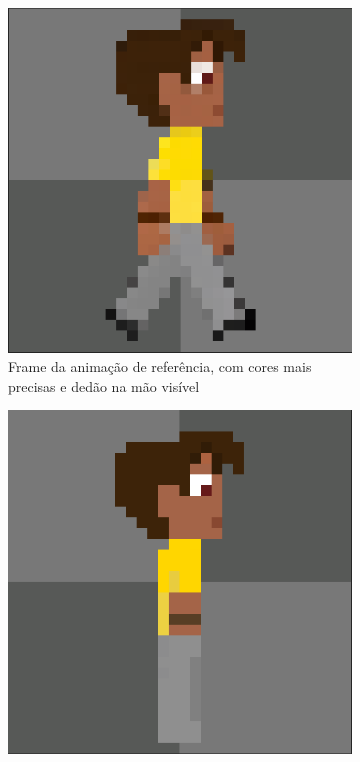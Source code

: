 \begin{figure}[htbp]
    \centering
    \caption{\small Comparação do sprite de referência com os frames da animação de base e da gerada no Pixel Lab}
    \label{fig:pixelLabAnimaComparaGemini}

    \begin{subfigure}{0.32\linewidth}
        \includegraphics[width=1\linewidth]{figs/pixelLab/dia4/print0.PNG}
        \caption{\small Frame da animação de referência, com cores mais precisas e dedão na mão visível}
        \label{fig:pixelLabAnimaComparaGeminiAni}
    \end{subfigure}
    \begin{subfigure}{0.32\linewidth}
        \includegraphics[width=1\linewidth]{figs/pixelLab/dia3/fix_oficial_fundo_igual.PNG}

\end{subfigure}
\end{figure}
